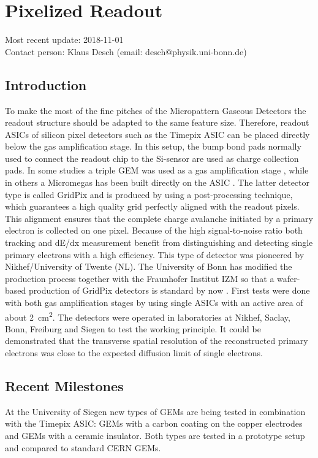 \section{Pixelized Readout}
\label{chap:TPC_sec:pixels}
Most recent update: 2018-11-01 \\
Contact person: Klaus Desch (email: desch@physik.uni-bonn.de)\\

\subsection{Introduction}
To make the most of the fine pitches of the Micropattern Gaseous Detectors the
readout structure should be adapted to the same feature size. Therefore,
readout ASICs of silicon pixel detectors such as the Timepix ASIC
\cite{Llopart2007485, Llopart2008106} can be placed directly below the gas amplification
stage. In this setup, the bump bond pads normally used to connect the readout
chip to the Si-sensor are used as charge collection pads. In some studies a
triple GEM was used as a gas amplification stage \cite{Bamberger:2006xp, 6359808},
while in others a Micromegas has been built
directly on the ASIC \cite{4526754}. The latter detector type is 
 called GridPix and is produced by using a post-processing technique, which
 guarantees a high quality grid perfectly aligned with the readout pixels. This
 alignment ensures that the complete charge avalanche initiated by a primary
 electron is collected on one pixel. Because of the high signal-to-noise
 ratio both tracking and dE/dx measurement benefit from distinguishing and
 detecting single primary electrons with a high efficiency. This type of
 detector was pioneered by Nikhef/University of Twente (NL). The University
 of Bonn has modified the 
 production process together with the Fraunhofer Institut IZM so that a
 wafer-based production of GridPix detectors is standard by now
 \cite{Koppert2013245}. First tests were done with both
 gas amplification stages by using single ASICs with an active area of about \SI{2}{\centi\meter\squared}. The detectors were operated in laboratories at Nikhef, Saclay, Bonn,
 Freiburg and Siegen to test the working principle. It could be demonstrated
 that the transverse spatial resolution of the reconstructed primary electrons
 was close to the expected diffusion limit of single electrons. 

 \subsection{Recent Milestones}
At the University of Siegen new types of GEMs are being tested in combination
with the Timepix ASIC: GEMs with a carbon coating on the copper electrodes and
GEMs with a ceramic insulator. Both types are tested in a prototype setup and
compared to standard CERN GEMs.

